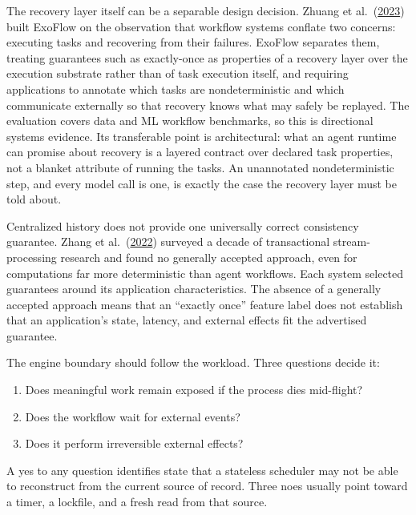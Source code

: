 The recovery layer itself can be a separable design decision. Zhuang et al.~(\href{https://www.usenix.org/conference/osdi23/presentation/zhuang}{2023}) built ExoFlow on the observation that workflow systems conflate two concerns: executing tasks and recovering from their failures. ExoFlow separates them, treating guarantees such as exactly-once as properties of a recovery layer over the execution substrate rather than of task execution itself, and requiring applications to annotate which tasks are nondeterministic and which communicate externally so that recovery knows what may safely be replayed. The evaluation covers data and ML workflow benchmarks, so this is directional systems evidence. Its transferable point is architectural: what an agent runtime can promise about recovery is a layered contract over declared task properties, not a blanket attribute of running the tasks. An unannotated nondeterministic step, and every model call is one, is exactly the case the recovery layer must be told about.

Centralized history does not provide one universally correct consistency guarantee. Zhang et al.~(\href{https://arxiv.org/abs/2208.09827}{2022}) surveyed a decade of transactional stream-processing research and found no generally accepted approach, even for computations far more deterministic than agent workflows. Each system selected guarantees around its application characteristics. The absence of a generally accepted approach means that an ``exactly once'' feature label does not establish that an application's state, latency, and external effects fit the advertised guarantee.


The engine boundary should follow the workload. Three questions decide it:

\begin{enumerate}
\def\labelenumi{\arabic{enumi}.}
\tightlist
\item
  Does meaningful work remain exposed if the process dies mid-flight?
\item
  Does the workflow wait for external events?
\item
  Does it perform irreversible external effects?
\end{enumerate}

A yes to any question identifies state that a stateless scheduler may not be able to reconstruct from the current source of record. Three noes usually point toward a timer, a lockfile, and a fresh read from that source.

